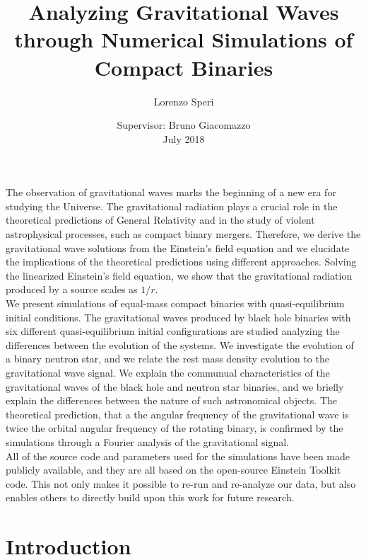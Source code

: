 \documentclass[twoside,english, a4paper, 12pt]{shared/uiofysmaster}
\author{Lorenzo Speri}
\title{\bf{Analyzing Gravitational Waves through Numerical Simulations of Compact Binaries}}
\date{Supervisor:
Bruno Giacomazzo\\
July 2018}
\begin{document}

\maketitle
\clearpage

\tableofcontents
\clearpage

\begin{abstract1}
The observation of gravitational waves marks the beginning of a new era for studying the Universe.
The gravitational radiation plays a crucial role in the theoretical predictions of General Relativity and in the study of violent astrophysical processes, such as compact binary mergers. 
Therefore, we derive the gravitational wave solutions from the Einstein's field equation and we elucidate the implications of the theoretical predictions using different approaches.
Solving the linearized Einstein's field equation, we show that the gravitational radiation produced by a source scales as $1/r$. \\
We present simulations of equal-mass compact binaries with quasi-equilibrium initial conditions.
The gravitational waves produced by black hole binaries with six different quasi-equilibrium initial configurations are studied analyzing the differences between the evolution of the systems.
We investigate the evolution of a binary neutron star, and we relate the rest mass density evolution to the gravitational wave signal.
We explain the communual characteristics of the gravitational waves of the black hole and neutron star binaries, and we briefly explain the differences between the nature of such astronomical objects.
The theoretical prediction, that a the angular frequency of the gravitational wave is twice the orbital angular frequency of the rotating binary, is confirmed by the simulations through a Fourier analysis of the gravitational signal.\\
All of the source code and parameters used for the simulations have been made publicly available, and they are all based on the open-source Einstein Toolkit code.  
This not only makes it possible to re-run and re-analyze our data, but also enables others to directly build upon this work for future research.
\end{abstract1}

\clearpage
\section{Introduction}

\end{document}
